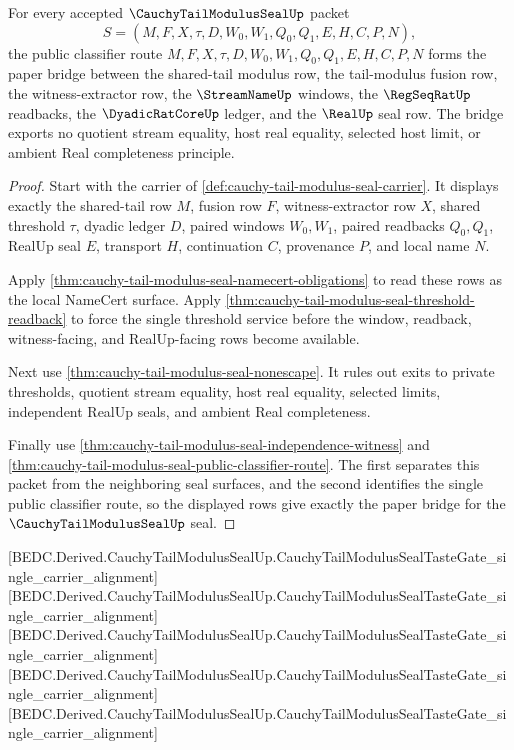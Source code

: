 \begin{theorem}
\label{thm:cauchy-tail-modulus-seal-paper-bridge}
For every accepted $\CauchyTailModulusSealUp$ packet
$$
S=(M,F,X,\tau,D,W_0,W_1,Q_0,Q_1,E,H,C,P,N),
$$
the public classifier route $M,F,X,\tau,D,W_0,W_1,Q_0,Q_1,E,H,C,P,N$ forms the paper bridge between the shared-tail modulus row, the tail-modulus fusion row, the witness-extractor row, the $\StreamNameUp$ windows, the $\RegSeqRatUp$ readbacks, the $\DyadicRatCoreUp$ ledger, and the $\RealUp$ seal row. The bridge exports no quotient stream equality, host real equality, selected host limit, or ambient Real completeness principle.
\end{theorem}
\begin{proof}
Start with the carrier of \autoref{def:cauchy-tail-modulus-seal-carrier}. It displays exactly the shared-tail row $M$, fusion row $F$, witness-extractor row $X$, shared threshold $\tau$, dyadic ledger $D$, paired windows $W_0,W_1$, paired readbacks $Q_0,Q_1$, RealUp seal $E$, transport $H$, continuation $C$, provenance $P$, and local name $N$.

Apply \autoref{thm:cauchy-tail-modulus-seal-namecert-obligations} to read these rows as the local NameCert surface. Apply \autoref{thm:cauchy-tail-modulus-seal-threshold-readback} to force the single threshold service before the window, readback, witness-facing, and RealUp-facing rows become available.

Next use \autoref{thm:cauchy-tail-modulus-seal-nonescape}. It rules out exits to private thresholds, quotient stream equality, host real equality, selected limits, independent RealUp seals, and ambient Real completeness.

Finally use \autoref{thm:cauchy-tail-modulus-seal-independence-witness} and \autoref{thm:cauchy-tail-modulus-seal-public-classifier-route}. The first separates this packet from the neighboring seal surfaces, and the second identifies the single public classifier route, so the displayed rows give exactly the paper bridge for the $\CauchyTailModulusSealUp$ seal.
\end{proof}

[BEDC.Derived.CauchyTailModulusSealUp.CauchyTailModulusSealTasteGate\_single\_carrier\_alignment]
[BEDC.Derived.CauchyTailModulusSealUp.CauchyTailModulusSealTasteGate\_single\_carrier\_alignment]
[BEDC.Derived.CauchyTailModulusSealUp.CauchyTailModulusSealTasteGate\_single\_carrier\_alignment]
[BEDC.Derived.CauchyTailModulusSealUp.CauchyTailModulusSealTasteGate\_single\_carrier\_alignment]
[BEDC.Derived.CauchyTailModulusSealUp.CauchyTailModulusSealTasteGate\_single\_carrier\_alignment]

